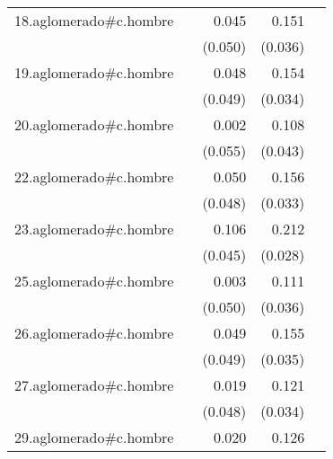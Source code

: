 {\begin{longtable}{l*{4}{D{.}{.}{-1}}}
\addlinespace
18.aglomerado#c.hombre&                     &       0.045         &       0.151\sym{***}&                     \\
            &                     &     (0.050)         &     (0.036)         &                     \\
\addlinespace
19.aglomerado#c.hombre&                     &       0.048         &       0.154\sym{***}&                     \\
            &                     &     (0.049)         &     (0.034)         &                     \\
\addlinespace
20.aglomerado#c.hombre&                     &       0.002         &       0.108\sym{*}  &                     \\
            &                     &     (0.055)         &     (0.043)         &                     \\
\addlinespace
22.aglomerado#c.hombre&                     &       0.050         &       0.156\sym{***}&                     \\
            &                     &     (0.048)         &     (0.033)         &                     \\
\addlinespace
23.aglomerado#c.hombre&                     &       0.106\sym{*}  &       0.212\sym{***}&                     \\
            &                     &     (0.045)         &     (0.028)         &                     \\
\addlinespace
25.aglomerado#c.hombre&                     &       0.003         &       0.111\sym{**} &                     \\
            &                     &     (0.050)         &     (0.036)         &                     \\
\addlinespace
26.aglomerado#c.hombre&                     &       0.049         &       0.155\sym{***}&                     \\
            &                     &     (0.049)         &     (0.035)         &                     \\
\addlinespace
27.aglomerado#c.hombre&                     &       0.019         &       0.121\sym{***}&                     \\
            &                     &     (0.048)         &     (0.034)         &                     \\
\addlinespace
29.aglomerado#c.hombre&                     &       0.020         &       0.126\sym{***}&                     \\

\end{longtable}}
